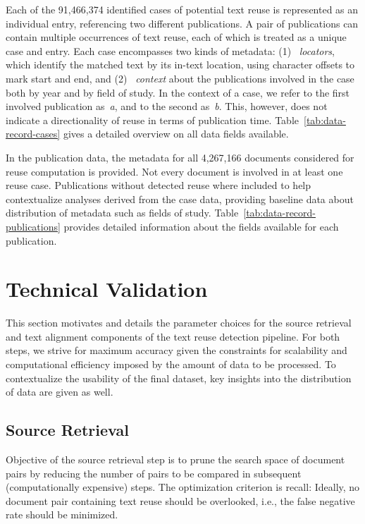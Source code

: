 \documentclass[fleqn,10pt]{wlscirep}
\newcommand{\Ni}{(1)~}
\newcommand{\Nii}{(2)~}
\begin{document}
Each of the 91,466,374 identified cases of potential text reuse is represented as an individual entry, referencing two different publications. A pair of publications can contain multiple occurrences of text reuse, each of which is treated as a unique case and entry. Each case encompasses two kinds of metadata:
\Ni
\textit{locators}, which identify the matched text by its in-text location, using character offsets to mark start and end, and
\Nii
\textit{context} about the publications involved in the case both by year and by field of study.
In the context of a case, we refer to the first involved publication as~\textit{a}, and to the second as~\textit{b}. This, however, does not indicate a directionality of reuse in terms of publication time. Table~\ref{tab:data-record-cases} gives a detailed overview on all data fields available.

In the publication data, the metadata for all 4,267,166 documents considered for reuse computation is provided. Not every document is involved in at least one reuse case. Publications without detected reuse where included to help contextualize analyses derived from the case data, providing baseline data about distribution of metadata such as fields of study. Table~\ref{tab:data-record-publications} provides detailed information about the fields available for each publication. 


\section*{Technical Validation}

This section motivates and details the parameter choices for the source retrieval and text alignment components of the text reuse detection pipeline. For both steps, we strive for maximum accuracy given the constraints for scalability and computational efficiency imposed by the amount of data to be processed. To contextualize the usability of the final dataset, key insights into the distribution of data are given as well.


\subsection*{Source Retrieval}

Objective of the source retrieval step is to prune the search space of document pairs by reducing the number of pairs to be compared in subsequent (computationally expensive) steps. The optimization criterion is recall: Ideally, no document pair containing text reuse should be overlooked, i.e., the false negative rate should be minimized.
\end{document}
